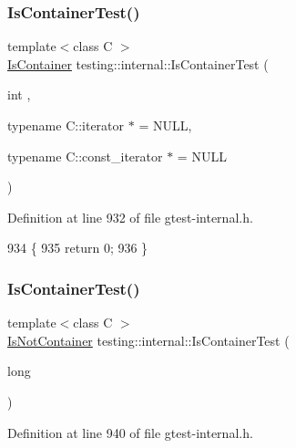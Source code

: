 \subsubsection{\texorpdfstring{Is\+Container\+Test()}{IsContainerTest()}\hspace{0.1cm}{\footnotesize\ttfamily [1/2]}}
{\footnotesize\ttfamily template$<$class C $>$ \\
\hyperlink{namespacetesting_1_1internal_ad8f0c2883245f1df2a53618a49f0deb3}{Is\+Container} testing\+::internal\+::\+Is\+Container\+Test (\begin{DoxyParamCaption}\item[{int}]{,  }\item[{typename C\+::iterator $\ast$}]{ = {\ttfamily NULL},  }\item[{typename C\+::const\+\_\+iterator $\ast$}]{ = {\ttfamily NULL} }\end{DoxyParamCaption})}



Definition at line 932 of file gtest-\/internal.\+h.


\begin{DoxyCode}
934                                                                 \{
935   \textcolor{keywordflow}{return} 0;
936 \}
\end{DoxyCode}
\mbox{\label{namespacetesting_1_1internal_af545a2ae928b8a9e7581978234464275}} 
\subsubsection{\texorpdfstring{Is\+Container\+Test()}{IsContainerTest()}\hspace{0.1cm}{\footnotesize\ttfamily [2/2]}}
{\footnotesize\ttfamily template$<$class C $>$ \\
\hyperlink{namespacetesting_1_1internal_abf080521ce135deb510e0a7830fd3d33}{Is\+Not\+Container} testing\+::internal\+::\+Is\+Container\+Test (\begin{DoxyParamCaption}\item[{long}]{ }\end{DoxyParamCaption})}



Definition at line 940 of file gtest-\/internal.\+h.



